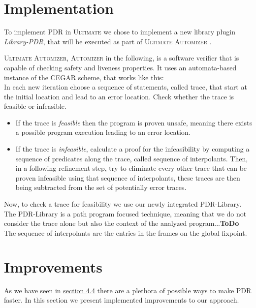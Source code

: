 \documentclass[11pt, a4paper, BCOR=10mm, ngerman]{scrbook}
\begin{document}
\section{Implementation}
To implement PDR in \textsc{Ultimate} we chose to implement a new library plugin \textsl{Library-PDR}, that will be executed as part of \textsc{Ultimate Automizer} \cite{Heizmann:2013:SMC:2526861.2526864}. \par 
\textsc{Ultimate Automizer}, \textsc{Automizer} in the following, is a software verifier that is capable of checking safety and liveness properties. It uses an automata-based \cite{DBLP:conf/cav/HeizmannHP13} instance of the CEGAR scheme, that works like this: \\
 In each new iteration choose a sequence of statements, called trace, that start at the initial location and lead to an error location. Check whether the trace is feasible or infeasible. \\
 \begin{itemize}
	\item If the trace is \textsl{feasible} then the program is proven unsafe, meaning there exists a possible program execution leading to an error location.
	\item If the trace is \textsl{infeasible}, calculate a proof for the infeasibility by computing a sequence of predicates along the trace, called sequence of interpolants. Then, in a following refinement step, try to eliminate every other trace that can be proven infeasible using that sequence of interpolants, these traces are then being subtracted from the set of potentially error traces.
 \end{itemize}
 \par
 Now, to check a trace for feasibility we use our newly integrated PDR-Library. 
 The PDR-Library is a path program focused technique, meaning that we do not consider the trace alone but also the context of the analyzed program...\textbf{ToDo} \\
 
 The sequence of interpolants are the entries in the frames on the global fixpoint.
 

\section{Improvements}
As we have seen in \hyperref[improvements]{section 4.4} there are a plethora of possible ways to make PDR faster. In this section we present implemented improvements to our approach.
\end{document}
